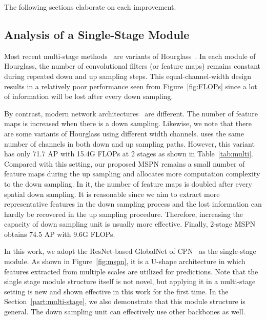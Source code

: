 \documentclass[10pt,twocolumn,letterpaper]{article}
\begin{document}
The following sections elaborate on each improvement.

\subsection{Analysis of a Single-Stage Module}
\label{part:single_stage_module}

Most recent multi-stage methods~\cite{yang2017learning,ke2018multi, Chen_2017_ICCV, Xiao-Multi, Tang_2018_ECCV} are variants of Hourglass~\cite{newell2016stacked}. In each module of Hourglass, the number of convolutional filters (or feature maps) remains constant during repeated down and up sampling steps. This equal-channel-width design results in a relatively poor performance seen from Figure~\ref{fig:FLOPs} since a lot of information will be lost after every down sampling. 

By contrast, modern network architectures~\cite{simonyan2014very,he2016deep,xie2017aggregated,hu2017squeeze,chollet2017xception,howard2017mobilenets} are different. The number of feature maps is increased when there is a down sampling. Likewise, we note that there are some variants of Hourglass using different width channels. \cite{newell2017associative} uses the same number of channels  in both down and up sampling paths. However, this variant has only 71.7 AP with 15.4G FLOPs at 2 stages as shown in Table~\ref{tab:multi}. Compared with this setting, our proposed MSPN remains a small number of feature maps  during the up sampling and allocates more computation complexity to the down sampling. In it, the number of feature maps is doubled after every spatial down sampling. It is reasonable since we aim to extract more representative features in the down sampling process and the lost information can hardly be recovered in the up sampling procedure. Therefore, increasing the capacity of down sampling unit is usually more effective. Finally, 2-stage MSPN obtains 74.5 AP with 9.6G FLOPs.



In this work, we adopt the ResNet-based GlobalNet of CPN~\cite{chen2018cascaded} as the single-stage module. As shown in Figure~\ref{fig:mspn}, it is a U-shape architecture in which features extracted from multiple scales are utilized for predictions. Note that the single stage module structure itself is not novel, but applying it in a multi-stage setting is new and shown effective in this work for the first time. In the Section~\ref{part:multi-stage}, we also demonstrate that this module structure is general. The down sampling unit can effectively use other backbones as well.
\end{document}
